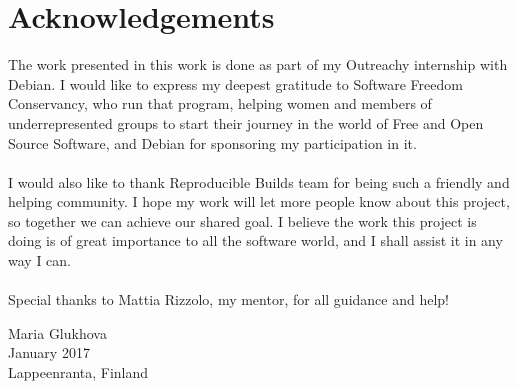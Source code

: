 \section*{Acknowledgements}

The work presented in this work is done as part of my Outreachy internship
with Debian. I would like to express my deepest gratitude to Software Freedom
Conservancy, who run that program, helping women and members of
underrepresented groups to start their journey in the world of Free and Open
Source Software, and Debian for sponsoring my participation in it.\\\\
I would also like to thank Reproducible Builds team for being such a
friendly and helping community. I hope my work will let more people
know about this project, so together we can achieve our shared goal.
I believe the work this project is doing is of great importance to all
the software world, and I shall assist it in any way I can.\\\\
Special thanks to Mattia Rizzolo, my mentor, for all guidance and help!

Maria Glukhova\\
January 2017\\
Lappeenranta, Finland\\
